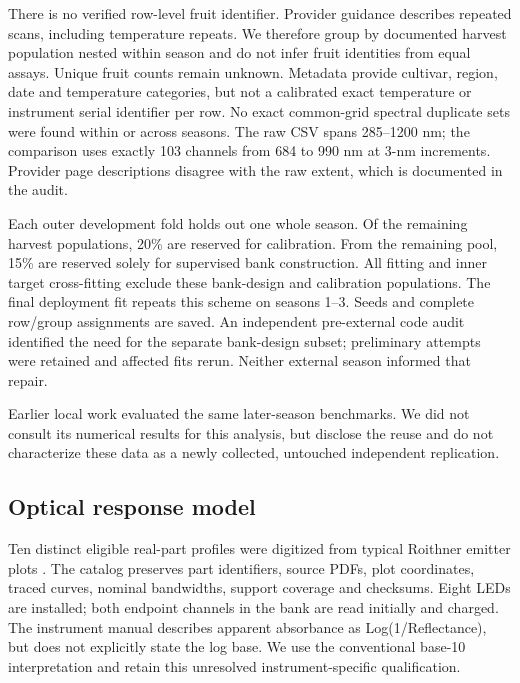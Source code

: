 \documentclass[11pt,a4paper]{article}
\begin{document}
There is no verified row-level fruit identifier. Provider guidance describes repeated scans, including temperature repeats. We therefore group by documented harvest population nested within season and do not infer fruit identities from equal assays. Unique fruit counts remain unknown. Metadata provide cultivar, region, date and temperature categories, but not a calibrated exact temperature or instrument serial identifier per row. No exact common-grid spectral duplicate sets were found within or across seasons. The raw CSV spans 285--1200 nm; the comparison uses exactly 103 channels from 684 to 990 nm at 3-nm increments. Provider page descriptions disagree with the raw extent, which is documented in the audit.

Each outer development fold holds out one whole season. Of the remaining harvest populations, 20\% are reserved for calibration. From the remaining pool, 15\% are reserved solely for supervised bank construction. All fitting and inner target cross-fitting exclude these bank-design and calibration populations. The final deployment fit repeats this scheme on seasons 1--3. Seeds and complete row/group assignments are saved. An independent pre-external code audit identified the need for the separate bank-design subset; preliminary attempts were retained and affected fits rerun. Neither external season informed that repair.

Earlier local work evaluated the same later-season benchmarks. We did not consult its numerical results for this analysis, but disclose the reuse and do not characterize these data as a newly collected, untouched independent replication.

\subsection{Optical response model}
Ten distinct eligible real-part profiles were digitized from typical Roithner emitter plots \citep{roithnercatalog}. The catalog preserves part identifiers, source PDFs, plot coordinates, traced curves, nominal bandwidths, support coverage and checksums. Eight LEDs are installed; both endpoint channels in the bank are read initially and charged. The instrument manual describes apparent absorbance as Log(1/Reflectance), but does not explicitly state the log base. We use the conventional base-10 interpretation and retain this unresolved instrument-specific qualification.
\end{document}

